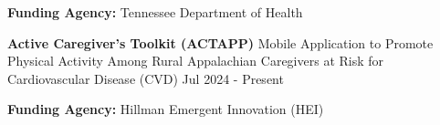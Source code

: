 \documentclass[10pt, letterpaper]{article}
\newenvironment{highlights}{
    \begin{itemize}[
        topsep=0.10 cm,
        parsep=0.10 cm,
        partopsep=0pt,
        itemsep=0pt,
        leftmargin=0 cm + 10pt
    ]
}{
    \end{itemize}
} %
\newenvironment{twocolentry}[2][]{
    \onecolentry
    \def\secondColumn{#2}
    \setcolumnwidth{\fill, 4.5 cm}
    \begin{paracol}{2}
}{
    \switchcolumn \raggedleft \secondColumn
    \end{paracol}
    \endonecolentry
} %
\begin{document}
        \vspace{0.1em} 
            \textbf{Funding Agency:} Tennessee Department of Health
        
        \vspace{0.1cm} \begin{twocolentry}{Jul 2024 - Present} \textbf{Active Caregiver’s Toolkit (ACTAPP)} \textbar Mobile Application to Promote Physical Activity Among Rural Appalachian Caregivers at Risk for Cardiovascular Disease (CVD) \end{twocolentry} 
        
         \textbf{Funding Agency:} Hillman Emergent Innovation (HEI)
\end{document}
